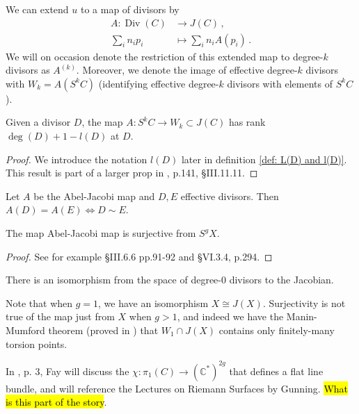 \documentclass{article}
\begin{document}
\begin{remark}
	We can extend $u$ to a map of divisors by 
	\begin{align*}
	A : \operatorname{Div}(C) &\to J(C) \, ,\\
	\sum_i n_i p_i  &\mapsto \sum_i n_i A(p_i) \, .
	\end{align*}
	We will on occasion denote the restriction of this extended map to degree-$k$ divisors as $A^{(k)}$. Moreover, we denote the image of effective degree-$k$ divisors with $W_k = A(S^kC)$ (identifying effective degree-$k$ divisors with elements of $S^k C$). 
\end{remark}

\begin{lemma}\label{lemma: rank of the Abel-Jacobi map}
	Given a divisor $D$, the map $A:S^k C \to W_k \subset J(C)$ has rank $\deg(D)+1-l(D)$ at $D$. 
\end{lemma}
\begin{proof}
	We introduce the notation $l(D)$ later in definition \ref{def: L(D) and l(D)}. This result is part of a larger prop in \cite{Farkas1992}, p.141, \S III.11.11.
\end{proof}

\begin{theorem}
	Let $A$ be the Abel-Jacobi map and $D,E$ effective divisors. Then $A(D) = A(E) \Leftrightarrow D \sim E$. 
\end{theorem}

\begin{theorem}
	The map Abel-Jacobi map is surjective from $S^gX$. 
\end{theorem}
\begin{proof}
	See for example \cite{Farkas1992} \S III.6.6 pp.91-92 and \S VI.3.4, p.294.
\end{proof}

\begin{corollary}
	There is an isomorphism from the space of degree-0 divisors to the Jacobian. 
\end{corollary}

\begin{remark}
	Note that when $g=1$, we have an isomorphism $X \cong J(X)$. Surjectivity is not true of the map just from $X$ when $g>1$, and indeed we have the Manin-Mumford theorem (proved in \cite{Raynaud1983}) that $W_1 \cap J(X)$ contains only finitely-many torsion points. 
\end{remark}

\begin{remark}
	In \cite{Fay1973}, p. 3, Fay will discuss the 
	$\chi : \pi_1(C) \to (\mathbb{C}^\ast)^{2g}$  that defines a flat line bundle, and will reference the Lectures on Riemann Surfaces by Gunning. \hl{What is this part of the story}. 
\end{remark}
\end{document}
